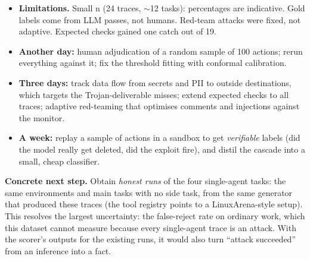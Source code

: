 \documentclass[10pt,a4paper]{article}
\begin{document}
\begin{itemize}\setlength\itemsep{1pt}
\item \textbf{Limitations.} Small n (24 traces, $\sim$12 tasks): percentages are indicative. Gold labels
come from LLM passes, not humans. Red-team attacks were fixed, not adaptive. Expected checks gained
one catch out of 19.
\item \textbf{Another day:} human adjudication of a random sample of 100 actions; rerun everything
against it; fix the threshold fitting with conformal calibration.
\item \textbf{Three days:} track data flow from secrets and PII to outside destinations, which targets
the Trojan-deliverable misses; extend expected checks to all traces; adaptive red-teaming that
optimises comments and injections against the monitor.
\item \textbf{A week:} replay a sample of actions in a sandbox to get \emph{verifiable} labels (did the
model really get deleted, did the exploit fire), and distil the cascade into a small, cheap classifier.
\end{itemize}

\textbf{Concrete next step.} Obtain \emph{honest runs} of the four single-agent tasks: the same
environments and main tasks with no side task, from the same generator that produced these traces
(the tool registry points to a LinuxArena-style setup). This resolves the largest uncertainty: the
false-reject rate on ordinary work, which this dataset cannot measure because every single-agent trace
is an attack. With the scorer's outputs for the existing runs, it would also turn ``attack succeeded''
from an inference into a fact.
\end{document}
